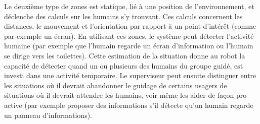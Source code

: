 \documentclass[a4paper,11pt,twoside]{StyleThese}
\begin{document}
Le deuxième type de zones est statique, lié à une position de l'environnement, et déclenche des calculs sur les humains s'y trouvant. Ces calculs concernent les distances, le mouvement et l'orientation par rapport à un point d'intérêt (comme par exemple un écran). En utilisant ces zones, le système peut détecter l'activité humaine (par exemple que l'humain regarde un écran d'information ou l'humain se dirige vers les toilettes). Cette estimation de la situation donne au robot la capacité de détecter quand un ou plusieurs des humains du groupe guidé, est investi dans une activité temporaire. Le superviseur peut ensuite distinguer entre les situations où il devrait abandonner le guidage de certains usagers de situations où il devrait attendre les humains, voir même les aider de façon pro-active (par exemple proposer des informations s'il détecte qu'un humain regarde un panneau d'informations).




%

\end{document}
